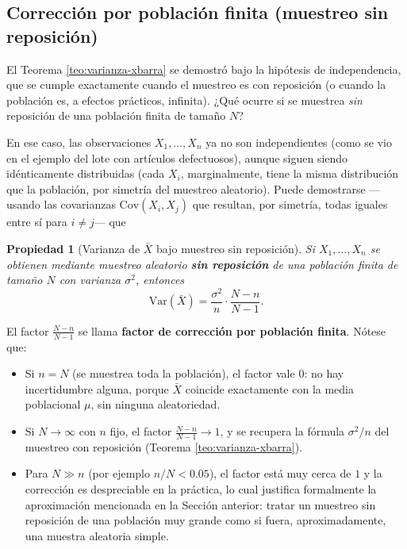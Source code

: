 \documentclass[11pt,a4paper]{article}
\theoremstyle{plain}
\newtheorem{propiedad}[teorema]{Propiedad}
\theoremstyle{definition}
\theoremstyle{remark}
\begin{document}
\subsection{Corrección por población finita (muestreo sin reposición)}
\label{subsec:correccion}

El Teorema \ref{teo:varianza-xbarra} se demostró bajo la hipótesis de independencia, que se cumple exactamente cuando el muestreo es con reposición (o cuando la población es, a efectos prácticos, infinita). ¿Qué ocurre si se muestrea \emph{sin} reposición de una población finita de tamaño $N$?

En ese caso, las observaciones $X_1,\dots,X_n$ ya no son independientes (como se vio en el ejemplo del lote con artículos defectuosos), aunque siguen siendo idénticamente distribuidas (cada $X_i$, marginalmente, tiene la misma distribución que la población, por simetría del muestreo aleatorio). Puede demostrarse —usando las covarianzas $\mathrm{Cov}(X_i,X_j)$ que resultan, por simetría, todas iguales entre sí para $i\neq j$— que

\begin{propiedad}[Varianza de $\bar X$ bajo muestreo sin reposición]
Si $X_1,\dots,X_n$ se obtienen mediante muestreo aleatorio \textbf{sin reposición} de una población finita de tamaño $N$ con varianza $\sigma^2$, entonces
$$\mathrm{Var}(\bar X) = \frac{\sigma^2}{n}\cdot\frac{N-n}{N-1}.$$
\end{propiedad}

El factor $\frac{N-n}{N-1}$ se llama \textbf{factor de corrección por población finita}. Nótese que:
\begin{itemize}
\item Si $n=N$ (se muestrea toda la población), el factor vale $0$: no hay incertidumbre alguna, porque $\bar X$ coincide exactamente con la media poblacional $\mu$, sin ninguna aleatoriedad.
\item Si $N\to\infty$ con $n$ fijo, el factor $\frac{N-n}{N-1}\to 1$, y se recupera la fórmula $\sigma^2/n$ del muestreo con reposición (Teorema \ref{teo:varianza-xbarra}).
\item Para $N\gg n$ (por ejemplo $n/N<0.05$), el factor está muy cerca de $1$ y la corrección es despreciable en la práctica, lo cual justifica formalmente la aproximación mencionada en la Sección anterior: tratar un muestreo sin reposición de una población muy grande como si fuera, aproximadamente, una muestra aleatoria simple.
\end{itemize}
\end{document}
